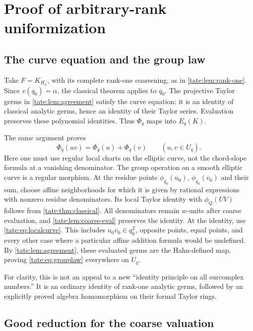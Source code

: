 \documentclass[11pt,letterpaper]{article}
\theoremstyle{definition}
\newcommand{\Z}{\mathbb Z}
\begin{document}
\section{Proof of arbitrary-rank uniformization}\label{tate:sec:uniformization}

\subsection{The curve equation and the group law}

Take $F=K_{H_\alpha}$, with its complete rank-one coarsening, as in
\cref{tate:lem:rank-one}. Since $v(q_0)=\alpha$, the classical theorem
applies to $q_0$. The projective Taylor germs in
\cref{tate:lem:agreement} satisfy the curve equation: it is an identity of
classical analytic germs, hence an identity of their Taylor series.
Evaluation preserves these polynomial identities. Thus $\Phi_q$ maps
into $E_q(K)$.

The same argument proves
\begin{equation}
 \Phi_q(uv)=\Phi_q(u)+\Phi_q(v)\qquad(u,v\in U_q).\label{tate:eq:grouplaw}
\end{equation}
Here one must use regular local charts on the elliptic curve, not the
chord-slope formula at a vanishing denominator. The group operation on a
smooth elliptic curve is a regular morphism. At the residue points
$\phi_{q_0}(u_0)$, $\phi_{q_0}(v_0)$ and their sum, choose affine
neighborhoods for which it is given by rational expressions with
nonzero residue denominators. Its local Taylor identity with
$\phi_Q(UV)$ follows from \cref{tate:thm:classical}. All denominators remain
$w$-units after coarse evaluation, and \cref{tate:lem:coarse-eval} preserves
the identity. At the identity, use \eqref{tate:eq:localcurve}. This includes
$u_0v_0\in q_0^\Z$, opposite points, equal points, and every other
case where a particular affine addition formula would be undefined.
By \cref{tate:lem:agreement}, these evaluated germs are the Hahn-defined
map, proving \eqref{tate:eq:grouplaw} everywhere on $U_q$.

For clarity, this is not an appeal to a new ``identity principle on
all surcomplex numbers.'' It is an ordinary identity of rank-one
analytic germs, followed by an explicitly proved algebra homomorphism
on their formal Taylor rings.

\subsection{Good reduction for the coarse valuation}
\end{document}

